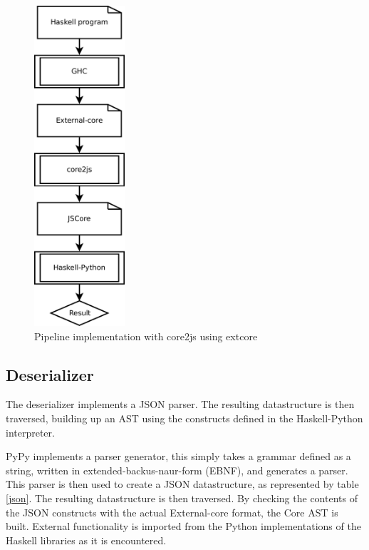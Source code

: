 \begin{figure}[H]
\begin{center}
\includegraphics[width=0.3\textwidth]{diags/pipe_w_core2js}
\caption[Pipeline with core2js]{Pipeline implementation with core2js using extcore}
\label{core2js}
\end{center}
\end{figure}

\subsection{Deserializer}

The deserializer implements a JSON parser. The resulting datastructure is then traversed, building up
an AST using the constructs defined in the Haskell-Python interpreter. 

PyPy implements a parser generator, this simply takes a grammar defined as a string, written in
extended-backus-naur-form (EBNF), and generates a parser. This parser is then used to create a 
JSON datastructure, as represented by table \ref{json}.
The resulting datastructure is then traversed. By checking the contents of the JSON constructs
with the actual External-core format, the Core AST is built. External functionality is imported
from the Python implementations of the Haskell libraries as it is encountered. 

